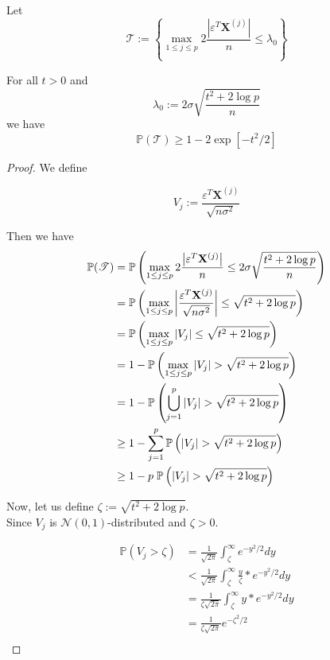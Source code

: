 Let
$$\mathscr{T} := \left\{\max _{1 \leq j \leq p} 2 \frac{\left| \varepsilon^{T} \mathbf{X}^{(j)}\right|}{n} \leq \lambda_{0}\right\}$$

\begin{lemma}[Lemma 6.2.]
    For all $t > 0$ and
    $$\lambda_{0}:=2 \sigma \sqrt{\frac{t^{2}+2 \log p}{n}}$$
    we have
    $$\mathbb{P}(\mathscr{T}) \geq 1-2 \exp \left[-t^{2} / 2\right]$$
\end{lemma}
\begin{proof}
    We define

    $$
        V_{j} := \frac{\varepsilon^{T} \mathbf{X}^{(j)}}{\sqrt{n \sigma^{2}}}
    $$

    Then we have
    \begin{align}
        \nonumber
        \mathbb{P}(\mathscr{T})
         & = \P \left( \max _{1 \leq j \leq p} 2 \frac{\left| \varepsilon^{T} \mathbf{X}^{(j)}\right|}{n} \leq 2 \sigma \sqrt{\frac{t^{2}+2 \log p}{n}}  \right) \\
        \nonumber
         & =
        \P \left( \max _{1 \leq j \leq p} \left| \frac{\varepsilon^{T} \mathbf{X}^{(j)}}{\sqrt{n \sigma^{2}}} \right| \leq \sqrt{t^{2}+2 \log p}  \right)        \\
        \nonumber
         & =
        \P \left( \max _{1 \leq j \leq p} | V_{j} | \leq \sqrt{t^{2}+2 \log p}  \right)                                                                          \\
        \nonumber
         & = 1 - \P \left( \max _{1 \leq j \leq p} | V_{j} | > \sqrt{t^{2}+2 \log p}  \right)                                                                    \\
        \nonumber
         & = 1 - \P \left( \bigcup_{j = 1}^{p} | V_{j} | > \sqrt{t^{2}+2 \log p}  \right)                                                                        \\
        \nonumber
         & \geq 1 - \sum_{j = 1}^{p} \P \left( | V_{j} | > \sqrt{t^{2}+2 \log p}  \right)                                                                        \\
        \label{eqn: proof lemma 6.2.}
         & \geq 1 - p \; \P \left( | V_{j} | > \sqrt{t^{2}+2 \log p}  \right)
    \end{align}

    Now, let us define $\zeta := \sqrt{t^{2}+2 \log p}$. \\
    Since $V_j$ is $\mathscr{N} (0,1)$-distributed and $\zeta > 0$.

    \begin{align*}
        \mathbb{P}(V_j > \zeta) & = \frac{1}{\sqrt{2\pi}} \int_\zeta^{\infty} e^{-y^2/2} dy                     \\
                                & < \frac{1}{\sqrt{2\pi}} \int_\zeta^{\infty} \frac{y}{\zeta} * e^{-y^2 / 2} dy \\
                                & = \frac{1}{\zeta \sqrt{2\pi}} \int_\zeta^{\infty} y * e^{-y^2 / 2} dy         \\
                                & = \frac{1}{\zeta\sqrt{2\pi}} e^{-\zeta^2/2}                                   \\
    \end{align*}


\end{proof}
